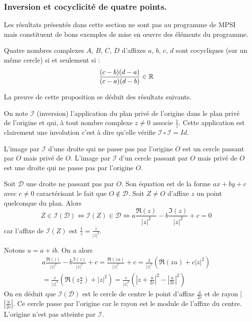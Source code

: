 \subsubsection{Inversion et cocyclicité de quatre points.} 
Les résultats présentés dans cette section ne sont pas au programme de MPSI mais constituent de bons exemples de mise en \oe{}uvre des éléments du programme.
\begin{prop}
  Quatre nombres complexes $A$, $B$, $C$, $D$ d'affixes $a$, $b$, $c$, $d$ sont cocycliques (sur un même cercle) si et seulement si :
  \begin{displaymath}
    \frac{(c-b)(d-a)}{(c-a)(d-b)} \in \mathbb{R}
  \end{displaymath}
\end{prop}
\begin{demo}
  La preuve de cette proposition se déduit des résultats suivants.
\end{demo}

On note $\mathcal{I}$ (inversion) l'application du plan privé de l'origine dans le plan privé de l'origine et qui, à tout nombre complexe $z\neq0$ associe $\frac{1}{z}$.\newline
Cette application est clairement une involution c'est à dire qu'elle vérifie $\mathcal{I}\circ \mathcal{I} = Id$.
\begin{prop}
 L'image par $\mathcal{I}$ d'une droite qui ne passe pas par l'origine $O$ est un cercle passant par $O$ mais privé de $O$. L'image par $\mathcal{I}$ d'un cercle passant par $O$ mais privé de $O$ est une droite qui ne passe pas par l'origine $O$.
\end{prop}
\begin{demo}
 Soit $\mathcal{D}$ une droite ne passant pas par $O$. Son équation est de la forme $ax+by+c$ avec $c\neq0$ caractérisant le fait que $O\not\in \mathcal D$.\newline
Soit $Z\neq O$ d'affixe $z$ un point quelconque du plan. Alors 
\begin{displaymath}
 Z\in \mathcal{I}(\mathcal{D})\Leftrightarrow \mathcal{I}(Z)\in \mathcal D
\Leftrightarrow a\frac{\Re(z)}{|z|^2} - b\frac{\Im(z)}{|z|^2} +c =0
\end{displaymath}
car l'affixe de $\mathcal{I}(Z)$ est $\frac{1}{z}=\frac{\overline{z}}{|z|^2}$.
\end{demo}
Notons $u=a+ib$. On a alors
\begin{multline*}
 a\frac{\Re(z)}{|z|^2} - b\frac{\Im(z)}{|z|^2} +c = \frac{\Re(zu)}{|z|^2}+c
= \frac{1}{|z|^2}\left( \Re(zu) + c|z|^2\right)\\
=  \frac{c}{|z|^2}\left( \Re(z\frac{u}{c}) + |z|^2\right)
= \frac{c}{|z|^2}\left(|z+\frac{\overline{u}}{2c}|^2 - \left|\frac{\overline{u}}{2c}\right|^2\right)
\end{multline*}
On en déduit que $\mathcal{I}(\mathcal{D})$ est le cercle de centre le point d'affixe $\frac{\overline{u}}{2c}$ et de rayon |$\left|\frac{\overline{u}}{2c}\right|$. Ce cercle passe par l'origine car le rayon est le module de l'affixe du centre. L'origine n'est pas atteinte par $\mathcal I$.

